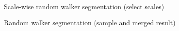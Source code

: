 \begin{figure}[p] \centering
  \\[-0.5cm]
  \\[-0.5cm]
  \\[-0.5cm]
  \caption{Scale-wise random walker segmentation (select scales)}
  \label{fig:rw-demo-scalewise}
\end{figure}


\begin{figure}[t] \centering
  \caption{Random walker segmentation (sample and merged result)}
  \label{fig:rw-demo-merged}
\end{figure}

%

